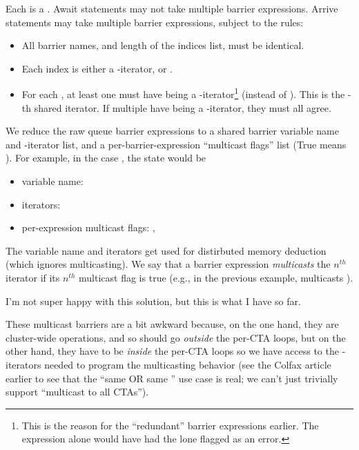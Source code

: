 \filbreak
{} Each  is a .
Await statements may not take multiple barrier expressions.
Arrive statements may take multiple barrier expressions, subject to the rules:
\begin{itemize}
  \item All barrier names, and length of the indices list, must be identical.
  \filbreak
  \item Each index is either a -iterator, or \lighttt{:}.
  \filbreak
  \item For each , at least one  must have  being a -iterator\footnote{This is the reason for the ``redundant'' barrier expressions earlier. The expression  alone would have had the lone \lighttt{:} flagged as an error.} (instead of \lighttt{:}).
    This is the -th shared  iterator.
    If multiple  have  being a -iterator, they must all agree.
\end{itemize}

\filbreak
We reduce the raw queue barrier expressions to a shared barrier variable name and -iterator list, and a per-barrier-expression ``multicast flags'' list (True means \lighttt{:}).
For example, in the case , the state would be
\begin{itemize}
  \item variable name: 
  \filbreak
  \item iterators: 
  \filbreak
  \item per-expression multicast flags: , 
\end{itemize}

The variable name and  iterators get used for distirbuted memory deduction (which ignores multicasting).
We say that a barrier expression \textit{multicasts} the $n^{th}$ iterator if its $n^{th}$ multicast flag is true (e.g., in the previous example,  multicasts ).

\filbreak
{} I'm not super happy with this solution, but this is what I have so far.

\filbreak
These multicast barriers are a bit awkward because, on the one hand, they are cluster-wide operations, and so should go \textit{outside} the per-CTA loops, but on the other hand, they have to be \textit{inside} the per-CTA loops so we have access to the -iterators needed to program the multicasting behavior (see the Colfax article earlier to see that the ``same  OR same '' use case is real; we can't just trivially support ``multicast to all CTAs'').

